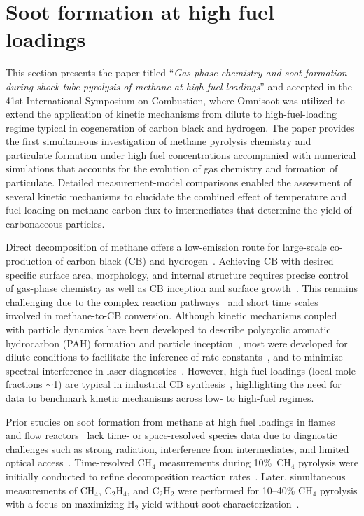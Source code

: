 \section{Soot formation at high fuel loadings}
\label{sec:paper2_high_fuel_loadings}


This section presents the paper titled ``\textit{Gas-phase chemistry and soot formation during shock-tube pyrolysis of methane at high fuel loadings}'' and accepted in the 41st International Symposium on Combustion, where Omnisoot was utilized to extend the application of kinetic mechanisms from dilute to high-fuel-loading regime typical in cogeneration of carbon black and hydrogen. The paper provides the first simultaneous investigation of methane pyrolysis chemistry and particulate formation under high fuel concentrations accompanied with numerical simulations that accounts for the evolution of gas chemistry and formation of particulate. Detailed measurement-model comparisons enabled the assessment of several kinetic mechanisms to elucidate the combined effect of temperature and fuel loading on methane carbon flux to intermediates that determine the yield of carbonaceous particles.

Direct decomposition of methane offers a low-emission route for large-scale co-production of carbon black (CB) and hydrogen~\citep{fulcheri2024plasma}. Achieving CB with desired specific surface area, morphology, and internal structure requires precise control of gas-phase chemistry as well as CB inception and surface growth~\citep{kang2025effect}. This remains challenging due to the complex reaction pathways~\citep{johansson2018resonance} and short time scales~\citep{martin2022soot} involved in methane-to-CB conversion. Although kinetic mechanisms coupled with particle dynamics have been developed to describe polycyclic aromatic hydrocarbon (PAH) formation and particle inception~\citep{frenklach2020mechanism}, most were developed for dilute conditions to facilitate the inference of rate constants~\citep{wang2016improved}, and to minimize spectral interference in laser diagnostics~\citep{kohse2005combustion}. However, high fuel loadings (local mole fractions $\sim$1) are typical in industrial CB synthesis~\citep{fulcheri2023energy}, highlighting the need for data to benchmark kinetic mechanisms across low- to high-fuel regimes. 

Prior studies on soot formation from methane at high fuel loadings in flames~\citep{liu2022effect} and flow reactors~\citep{mokashi2024understanding} lack time- or space-resolved species data due to diagnostic challenges such as strong radiation, interference from intermediates, and limited optical access~\citep{karatacs2012soot}. Time-resolved CH$_4$ measurements during 10\%~CH$_4$ pyrolysis were initially conducted to refine decomposition reaction rates~\citep{nativel2019shock}. Later, simultaneous measurements of $\mathrm{CH_4}$, $\mathrm{C_2H_4}$, and $\mathrm{C_2H_2}$ were performed for 10–40\% $\mathrm{CH_4}$ pyrolysis with a focus on maximizing H$_2$ yield without soot characterization~\cite{ferris2024experimental}. 

